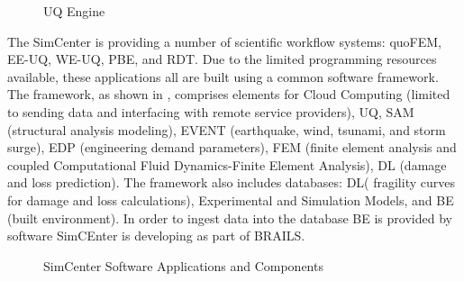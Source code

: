  \begin{figure}[!htbp]
  \caption{UQ Engine}
  \label{fig:uqEngine}
\end{figure}


The SimCenter is providing a number of scientific workflow  systems:  quoFEM, EE-UQ, WE-UQ, PBE, and RDT. Due to the limited programming resources available, these applications all are built using a common software framework. The framework, as shown in , comprises elements for Cloud Computing (limited to sending data and interfacing with remote service providers), UQ, SAM (structural analysis modeling), EVENT (earthquake, wind, tsunami, and storm surge), EDP (engineering demand parameters), FEM (finite element analysis and coupled Computational Fluid Dynamics-Finite Element Analysis), DL (damage and loss prediction). The framework also includes databases: DL( fragility curves for damage and loss calculations), Experimental and Simulation Models, and BE (built environment). In order to ingest data into the database BE is provided by software SimCEnter is developing as part of BRAILS.


\begin{figure}[!htbp]
  \caption{SimCenter Software Applications and Components}
  \label{fig:SimCenterSoftware}
\end{figure}

